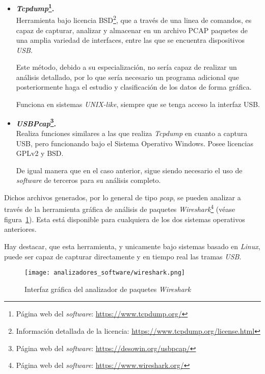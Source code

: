\begin{itemize}
    \item \textbf{\emph{Tcpdump}\footnote{Página web del \emph{software}: \url{https://www.tcpdump.org/}}.} \\
    Herramienta bajo licencia BSD\footnote{Información detallada de la licencia: \url{https://www.tcpdump.org/license.html}}, que a través de una linea de comandos, es capaz de capturar, analizar y almacenar en un archivo PCAP paquetes de una amplia variedad de interfaces, entre las que se encuentra dispositivos \emph{USB}.

    Este método, debido a su especialización, no sería capaz de realizar un análisis detallado, por lo que sería necesario un programa adicional que posteriormente haga el estudio y clasificación de los datos de forma gráfica.

    Funciona en sistemas \emph{UNIX-like}, siempre que se tenga acceso la interfaz USB.
    
    \item \textbf{\emph{USBPcap}\footnote{Página web del \emph{software}: \url{https://desowin.org/usbpcap/}}.} \\
    Realiza funciones similares a las que realiza \emph{Tcpdump} en cuanto a captura USB, pero funcionando bajo el Sistema Operativo Windows\texttrademark. Posee licencias GPLv2 y BSD.
    
    De igual manera que en el caso anterior, sigue siendo necesario el uso de \emph{software} de terceros para su análisis completo.
\end{itemize}

Dichos archivos generados, por lo general de tipo \emph{pcap}\cite{guyharris2015}, se pueden analizar a través de la herramienta gráfica de análisis de paquetes \emph{Wireshark}\footnote{Página web del \emph{software}: \url{https://www.wireshark.org/}} (véase figura~\ref{fig:gui-open-wireshark}). Esta está disponible para cualquiera de los dos sistemas operativos anteriores.

Hay destacar, que esta herramienta, y unicamente bajo sistemas basado en \emph{Linux}, puede ser capaz de capturar directamente y en tiempo real las tramas \emph{USB}.

\begin{figure}[hbt]
    \centering
    \texttt{[image: analizadores\_software/wireshark.png]}
    \caption{Interfaz gráfica del analizador de paquetes \emph{Wireshark}}
    \label{fig:gui-open-wireshark}
\end{figure}


